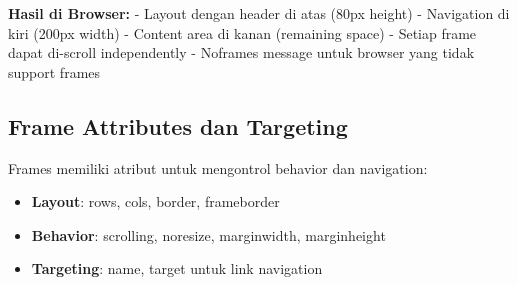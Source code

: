 \textbf{Hasil di Browser:}
- Layout dengan header di atas (80px height)
- Navigation di kiri (200px width)
- Content area di kanan (remaining space)
- Setiap frame dapat di-scroll independently
- Noframes message untuk browser yang tidak support frames

\subsection{Frame Attributes dan Targeting}

Frames memiliki atribut untuk mengontrol behavior dan navigation:

\begin{itemize}
  \item \textbf{Layout}: rows, cols, border, frameborder
  \item \textbf{Behavior}: scrolling, noresize, marginwidth, marginheight
  \item \textbf{Targeting}: name, target untuk link navigation
\end{itemize}

